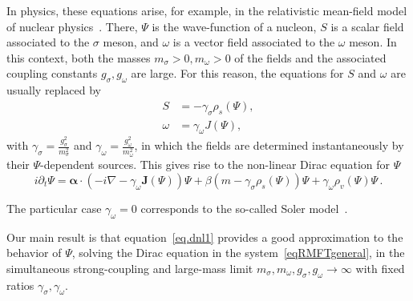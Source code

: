 \documentclass[10pt]{amsart}
\theoremstyle{definition}\newtheorem{defi}[theo]{Definition}\newtheorem{rema}[theo]{Remark}\newtheorem{exam}[theo]{Example}\newtheorem{exem}[theo]{Example}\newtheorem{nota}[theo]{Notation}
\begin{document}
In physics, these equations arise, for example, in the relativistic mean-field model of nuclear physics~\cite{Ring-96}. There, $\Psi$ is the wave-function of a nucleon, $S$ is a scalar field associated to the $\sigma$ meson, and $\omega$ is a vector field associated to the $\omega$ meson. In this context, both the masses $m_\sigma>0, m_\omega>0$ of the fields and the associated coupling constants $g_\sigma, g_\omega$ are large. For this reason, the equations for $S$ and $\omega$ are usually replaced by
\begin{equation}\label{eq:instant}
\begin{split}
S&=-\gamma_\sigma \rho_s(\Psi), \\
\omega&=\gamma_\omega J(\Psi),
\end{split}
\end{equation}
with $\gamma_\sigma=\tfrac{g_\sigma^2}{m_\sigma^2}$ and $\gamma_\omega=\frac{g_\omega^2}{m_\omega^2}$, in which the fields are determined instantaneously by their $\Psi$-dependent sources. This gives rise to the non-linear Dirac equation for $\Psi$
\begin{equation}\label{eq.dnl1}
i\partial_t\Psi = \bm \alpha\cdot\left(-i\nabla-\gamma_\omega {\bm J}(\Psi)
\right)\Psi +\beta\left(m - \gamma_\sigma \rho_s(\Psi) \right)\Psi +\gamma_\omega\rho_v(\Psi)\Psi
\,.
\end{equation}

The particular case $\gamma_\omega=0$ corresponds to the so-called Soler model~\cite{CazVaz-86,Soler-70}.

Our main result is that equation~\eqref{eq.dnl1} provides a good approximation to the behavior of $\Psi$, solving the Dirac equation in the system~\eqref{eqRMFTgeneral}, in the simultaneous strong-coupling and large-mass limit $m_\sigma, m_\omega, g_\sigma, g_\omega \to \infty$ with fixed ratios $\gamma_\sigma, \gamma_\omega$.
\end{document}
